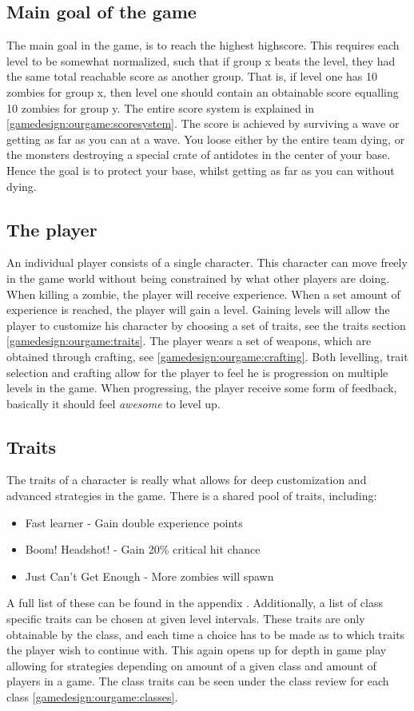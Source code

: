 \subsection*{Main goal of the game}
The main goal in the game, is to reach the highest highscore. This requires each level to be somewhat normalized, such that if group x beats the level, they had the same total reachable score as another group. That is, if level one has 10 zombies for group x, then level one should contain an obtainable score equalling 10 zombies for group y. The entire score system is explained in \ref{gamedesign:ourgame:scoresystem}. The score is achieved by surviving a wave or getting as far as you can at a wave. You loose either by the entire team dying, or the monsters destroying a special crate of antidotes in the center of your base. Hence the goal is to protect your base, whilst getting as far as you can without dying.

\subsection*{The player}
 An individual player consists of a single character. This character can move freely in the game world without being constrained by what other players are doing. When killing a zombie, the player will receive experience. When a set amount of experience is reached, the player will gain a level. Gaining levels will allow the player to customize his character by choosing a set of traits, see the traits section \ref{gamedesign:ourgame:traits}. The player wears a set of weapons, which are obtained through crafting, see \ref{gamedesign:ourgame:crafting}. Both levelling, trait selection and crafting allow for the player to feel he is progression on multiple levels in the game. When progressing, the player receive some form of feedback, basically it should feel \emph{awesome} to level up.

\subsection*{Traits}\label{gamedesign:ourgame:traits}
The traits of a character is really what allows for deep customization and advanced strategies in the game. There is a shared pool of traits, including:
\begin{itemize}
\item Fast learner - Gain double experience points
\item Boom! Headshot!  - Gain 20\% critical hit chance
\item Just Can’t Get Enough - More zombies will spawn
\end{itemize} 
A full list of these can be found in the appendix . Additionally, a list of class specific traits can be chosen at given level intervals. These traits are only obtainable by the class, and each time a choice has to be made as to which traits the player wish to continue with. This again opens up for depth in game play allowing for strategies depending on amount of a given class and amount of players in a game. The class traits can be seen under the class review for each class \ref{gamedesign:ourgame:classes}.

